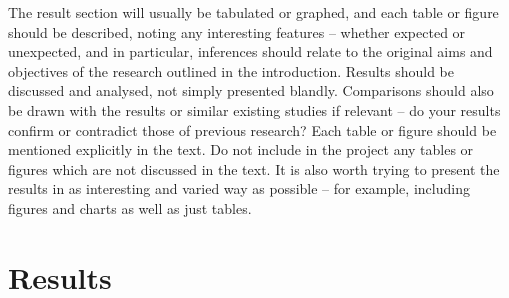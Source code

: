 The result section will usually be tabulated or graphed, and each table or figure should be described, noting any interesting features – whether expected or unexpected, and in particular, inferences should relate to the original aims and objectives of the research outlined in the introduction. Results should be discussed and analysed, not simply presented blandly. Comparisons should also be drawn with the results or similar existing studies if relevant – do your results confirm or contradict those of previous research? Each table or figure should be mentioned explicitly in the text. Do not include in the project any tables or figures which are not discussed in the text. It is also worth trying to present the results in as interesting and varied way as possible – for example, including figures and charts as well as just tables.


\chapter{Results}